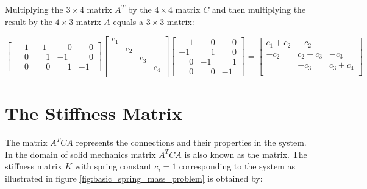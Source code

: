 Multiplying the $3 \times 4$ matrix $A^T$ by the $4 \times 4$ matrix
$C$ and then multiplying the result by the $4 \times 3$ matrix $A$ equals
a $3 \times 3$ matrix:

\begin{equation*}
\begin{bmatrix}
  \phantom{-}1 &           -1 & \phantom{-}0 & \phantom{-}0 \\
  \phantom{-}0 & \phantom{-}1 &           -1 & \phantom{-}0 \\
  \phantom{-}0 & \phantom{-}0 & \phantom{-}1 &           -1 
\end{bmatrix}
\begin{bmatrix}
c_1 &  &  &  \\
 & c_2 &  &  \\
 &  & c_3 &  \\
 &  &  & c_4 \\
\end{bmatrix}
\begin{bmatrix}
 \phantom{-}1 & \phantom{-}0 & \phantom{-}0 \\
           -1 & \phantom{-}1 & \phantom{-}0 \\
 \phantom{-}0 &           -1 & \phantom{-}1 \\
 \phantom{-}0 & \phantom{-}0 &           -1
\end{bmatrix}
=
\begin{bmatrix}
 c_1 + c_2 & -c_2       &            \\
      -c_2 &  c_2 + c_3 &       -c_3 \\
           &       -c_3 &  c_3 + c_4 \\
\end{bmatrix}
\end{equation*}

\section{The Stiffness Matrix}
\label{sec:the-stiffness-matrix}
The matrix $A^T C A$ represents the connections and their properties
in the system. In the domain of solid
mechanics matrix $A^T C A$ is also known as the 
 matrix. The stiffness matrix $K$ with spring constant
$c_i = 1$ corresponding to the
system as illustrated in
figure \vref{fig:basic_spring_mass_problem} is obtained by:


